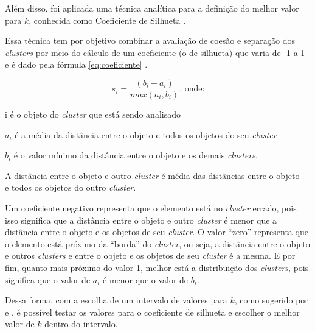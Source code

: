 \begin{apendicesenv}
Além disso, foi aplicada uma técnica analítica para a definição do melhor valor para $k$, conhecida como Coeficiente de Silhueta \cite{sklearn}.

Essa técnica tem por objetivo combinar a avaliação de coesão e separação dos \textit{clusters} por meio do cálculo de um coeficiente (o de silhueta) que 
varia de -1 a 1 e é dado pela fórmula \ref{eq:coeficiente} \cite{tan2013data}.

\begin{equation} \label{eq:coeficiente}
  s_{i} = \frac{(b_{i} - a_{i})}{max(a_{i}, b_{i})} \mbox{, onde:}
\end{equation}

{\addtolength{\leftskip}{8mm}
    i é o objeto do \textit{cluster} que está sendo analisado
    
    $a_{i}$ é a média da distância entre o objeto e todos os objetos do seu \textit{cluster}
    
    $b_{i}$ é o valor mínimo da distância entre o objeto e os demais \textit{clusters}. 
    
	  \footnotesize \indent \indent A distância entre o objeto e outro \textit{cluster} é média das distâncias entre o objeto \\ \indent \indent e todos os objetos do outro \textit{cluster}.
}

Um coeficiente negativo representa que o elemento está no \textit{cluster} errado, pois isso significa que a distância entre o objeto e outro \textit{cluster} 
é menor que a distância entre o objeto e os objetos de seu \textit{cluster}. O valor ``zero'' representa que o elemento está próximo da ``borda'' do \textit{cluster}, ou seja,
a distância entre o objeto e outros \textit{clusters} e entre o objeto e os objetos de seu \textit{cluster} é a mesma. E por fim, quanto mais próximo do valor 1, melhor
está a distribuição dos \textit{clusters}, pois significa que o valor de $a_i$ é menor que o valor de $b_i$.

Dessa forma, com a escolha de um intervalo de valores para $k$, como sugerido por  e , é possível testar os valores 
para o coeficiente de silhueta e escolher o melhor valor de $k$ dentro do intervalo. 


\end{apendicesenv}

